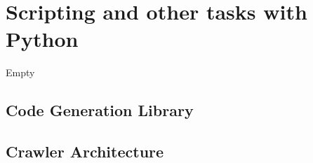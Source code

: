 \section{Scripting and other tasks with Python}

Empty

\subsection{Code Generation Library}

\subsection{Crawler Architecture}

